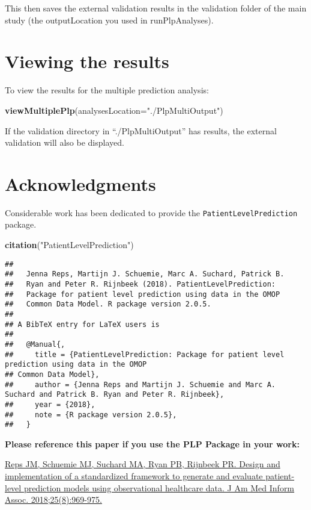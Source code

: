 \documentclass[]{article}
\newenvironment{Shaded}{\begin{snugshade}}{\end{snugshade}}
\newcommand{\KeywordTok}[1]{\textcolor[rgb]{0.13,0.29,0.53}{\textbf{#1}}}
\newcommand{\DataTypeTok}[1]{\textcolor[rgb]{0.13,0.29,0.53}{#1}}
\newcommand{\StringTok}[1]{\textcolor[rgb]{0.31,0.60,0.02}{#1}}
\newcommand{\NormalTok}[1]{#1}
\begin{document}
This then saves the external validation results in the validation folder
of the main study (the outputLocation you used in runPlpAnalyses).

\section{Viewing the results}\label{viewing-the-results}

To view the results for the multiple prediction analysis:

\begin{Shaded}
\begin{Highlighting}[]
\KeywordTok{viewMultiplePlp}\NormalTok{(}\DataTypeTok{analysesLocation=}\StringTok{"./PlpMultiOutput"}\NormalTok{)}
\end{Highlighting}
\end{Shaded}

If the validation directory in ``./PlpMultiOutput'' has results, the
external validation will also be displayed.

\section{Acknowledgments}\label{acknowledgments}

Considerable work has been dedicated to provide the
\texttt{PatientLevelPrediction} package.

\begin{Shaded}
\begin{Highlighting}[]
\KeywordTok{citation}\NormalTok{(}\StringTok{"PatientLevelPrediction"}\NormalTok{)}
\end{Highlighting}
\end{Shaded}

\begin{verbatim}
## 
##   Jenna Reps, Martijn J. Schuemie, Marc A. Suchard, Patrick B.
##   Ryan and Peter R. Rijnbeek (2018). PatientLevelPrediction:
##   Package for patient level prediction using data in the OMOP
##   Common Data Model. R package version 2.0.5.
## 
## A BibTeX entry for LaTeX users is
## 
##   @Manual{,
##     title = {PatientLevelPrediction: Package for patient level prediction using data in the OMOP
## Common Data Model},
##     author = {Jenna Reps and Martijn J. Schuemie and Marc A. Suchard and Patrick B. Ryan and Peter R. Rijnbeek},
##     year = {2018},
##     note = {R package version 2.0.5},
##   }
\end{verbatim}

\textbf{Please reference this paper if you use the PLP Package in your
work:}

\href{http://dx.doi.org/10.1093/jamia/ocy032}{Reps JM, Schuemie MJ,
Suchard MA, Ryan PB, Rijnbeek PR. Design and implementation of a
standardized framework to generate and evaluate patient-level prediction
models using observational healthcare data. J Am Med Inform Assoc.
2018;25(8):969-975.}
\end{document}
